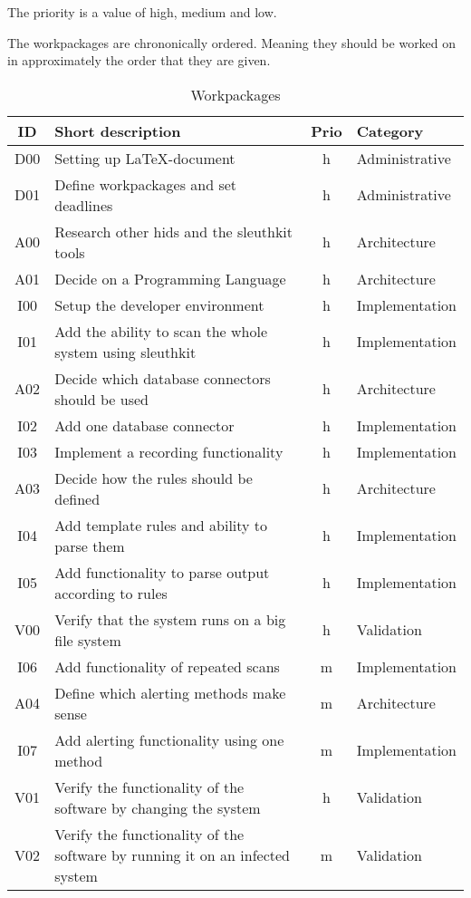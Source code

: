 \documentclass[
	a4paper,					%
	10pt,							%
	twoside,					%
	openright,				%
	notitlepage,			%
	parskip=half,			%
]{scrreprt}					%
\begin{document}
The priority is a value of high, medium and low. 

The workpackages are chrononically ordered. Meaning they should be worked on in approximately the order that they are given. 

\begin{table}[h!]
  \begin{center}
    \caption{Workpackages}
    \label{tab:workpackages}
    \begin{tabular}{c|l|c|l}
      \textbf{ID} & \textbf{Short description} & \textbf{Prio} & \textbf{Category} \\
      \hline
      D00 & Setting up \LaTeX -document & h & Administrative \\
      D01 & Define workpackages and set deadlines & h & Administrative \\
			A00 & Research other \gls{hids} and the sleuthkit tools & h & Architecture \\
			A01 & Decide on a Programming Language & h & Architecture \\
			I00 & Setup the developer environment & h & Implementation \\
			I01 & Add the ability to scan the whole system using sleuthkit & h & Implementation \\
			A02 & Decide which database connectors should be used & h & Architecture \\
			I02 & Add one database connector & h & Implementation \\
			I03 & Implement a recording functionality & h & Implementation \\
			A03 & Decide how the rules should be defined & h & Architecture \\
			I04 & Add template rules and ability to parse them & h & Implementation \\
			I05 & Add functionality to parse output according to rules & h & Implementation \\
			V00 & Verify that the system runs on a big file system & h & Validation \\
			I06 & Add functionality of repeated scans & m & Implementation \\
			A04 & Define which alerting methods make sense & m & Architecture \\ 
			I07 & Add alerting functionality using one method & m & Implementation \\
			V01 & Verify the functionality of the software by changing the system & h & Validation \\
			V02 & Verify the functionality of the software by running it on an infected system & m & Validation \\

\end{tabular}
\end{center}
\end{table}
\end{document}
